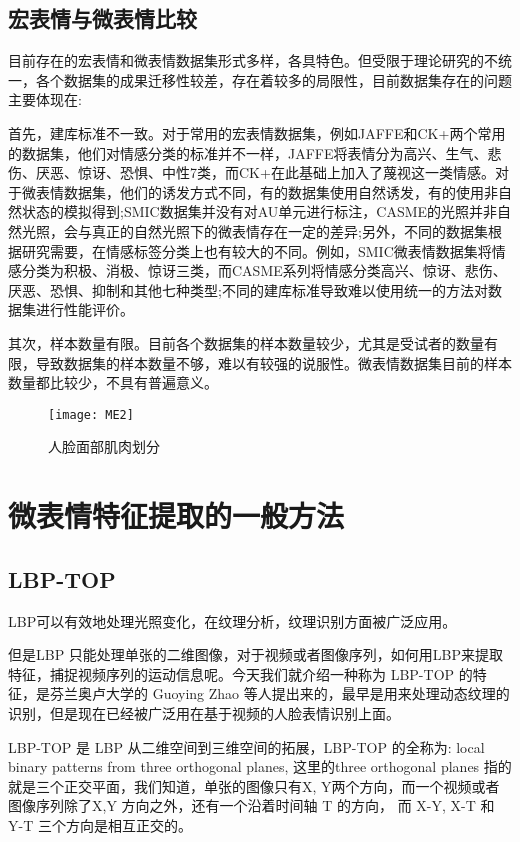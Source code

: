 \subsection{宏表情与微表情比较}

目前存在的宏表情和微表情数据集形式多样，各具特色。但受限于理论研究的不统一，各个数据集的成果迁移性较差，存在着较多的局限性，目前数据集存在的问题主要体现在:

首先，建库标准不一致。对于常用的宏表情数据集，例如JAFFE和CK+两个常用的数据集，他们对情感分类的标准并不一样，JAFFE将表情分为高兴、生气、悲伤、厌恶、惊讶、恐惧、中性7类，而CK+在此基础上加入了蔑视这一类情感。对于微表情数据集，他们的诱发方式不同，有的数据集使用自然诱发，有的使用非自然状态的模拟得到;SMIC数据集并没有对AU单元进行标注，CASME的光照并非自然光照，会与真正的自然光照下的微表情存在一定的差异;另外，不同的数据集根据研究需要，在情感标签分类上也有较大的不同。例如，SMIC微表情数据集将情感分类为积极、消极、惊讶三类，而CASME系列将情感分类高兴、惊讶、悲伤、厌恶、恐惧、抑制和其他七种类型;不同的建库标准导致难以使用统一的方法对数据集进行性能评价。

其次，样本数量有限。目前各个数据集的样本数量较少，尤其是受试者的数量有限，导致数据集的样本数量不够，难以有较强的说服性。微表情数据集目前的样本数量都比较少，不具有普遍意义。

\begin{figure}[!htbp]
    \centering
    \texttt{[image: ME2]}
    \caption{人脸面部肌肉划分}
    \label{fig4}
\end{figure}

\section{微表情特征提取的一般方法}

\subsection{LBP-TOP}

LBP可以有效地处理光照变化，在纹理分析，纹理识别方面被广泛应用。

但是LBP 只能处理单张的二维图像，对于视频或者图像序列，如何用LBP来提取特征，捕捉视频序列的运动信息呢。今天我们就介绍一种称为 LBP-TOP 的特征，是芬兰奥卢大学的 Guoying Zhao 等人提出来的，最早是用来处理动态纹理的识别，但是现在已经被广泛用在基于视频的人脸表情识别上面。

LBP-TOP 是 LBP 从二维空间到三维空间的拓展，LBP-TOP 的全称为: local binary patterns from three orthogonal planes, 这里的three orthogonal planes 指的就是三个正交平面，我们知道，单张的图像只有X, Y两个方向，而一个视频或者图像序列除了X,Y 方向之外，还有一个沿着时间轴 T 的方向， 而 X-Y, X-T 和 Y-T 三个方向是相互正交的。

